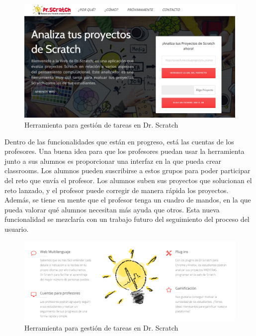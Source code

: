 \documentclass[a4paper, 12pt]{book}
\begin{document}
\begin{figure}
	\graphicspath{{img/}}
  \includegraphics[bb=0 0 800 600, width=12cm, keepaspectratio]{drscratchactual.png}
	\caption{Herramienta para gestión de tareas en Dr. Scratch}
  \label{figura:foro_hilos}
\end{figure}

Dentro de las funcionalidades que están en progreso, está las cuentas de los profesores.
Una buena idea para que los profesores puedan usar la herramienta junto a sus alumnos
es proporcionar una interfaz en la que pueda crear classrooms. Los alumnos pueden 
suscribirse a estos grupos para poder participar del reto que envía el profesor.
Los alumnos suben sus proyectos que solucionan el reto lanzado, y el profesor puede 
corregir de manera rápida los proyectos. \\

Además, se tiene en mente que el profesor tenga un cuadro de mandos, en la que pueda
valorar qué alumnos necesitan más ayuda que otros. Esta nueva funcionalidad se mezclaría
con un trabajo futuro del seguimiento del proceso del usuario.


\begin{figure}
	\graphicspath{{img/}}
  \includegraphics[bb=0 0 800 600, width=14cm, keepaspectratio]{nuevasfuncionalidades.png}
	\caption{Herramienta para gestión de tareas en Dr. Scratch}
  \label{figura:foro_hilos}
\end{figure}
\end{document}
